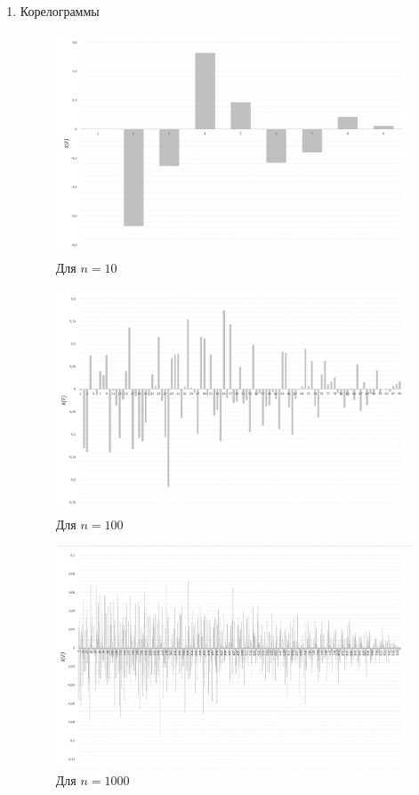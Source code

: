 \documentclass{article}
\begin{document}
\begin{enumerate}
			\item Корелограммы\\
				\begin{figure}[!htb]
					\includegraphics[scale=0.35]{1.png}
					\caption{Для $n = 10$}
				\end{figure}
				
				\begin{figure}[!htb]
					\includegraphics[scale=0.35]{2.png}
					\caption{Для $n = 100$}
				\end{figure}
				
				\begin{figure}[!htb]
					\includegraphics[scale=0.4]{3.png}
					\caption{Для $n = 1000$}
				\end{figure}
				

\end{enumerate}
\end{document}
